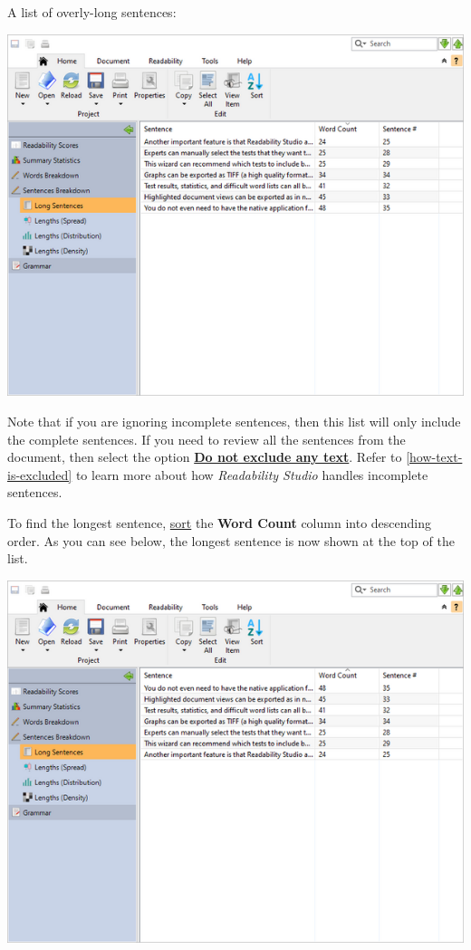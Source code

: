 \documentclass[
]{book}
\theoremstyle{definition}
\theoremstyle{definition}
\theoremstyle{definition}
\theoremstyle{definition}
\theoremstyle{remark}
\begin{document}
A list of overly-long sentences:

\includegraphics{Images/featuressentencelist.png}

Note that if you are ignoring incomplete sentences, then this list will only include the complete sentences. If you need to review all the sentences from the document, then select the option \protect\hyperlink{options-text-exclusion}{\textbf{Do not exclude any text}}. Refer to \ref{how-text-is-excluded} to learn more about how \emph{Readability Studio} handles incomplete sentences.

To find the longest sentence, \protect\hyperlink{column-sorting}{sort} the \textbf{Word Count} column into descending order. As you can see below, the longest sentence is now shown at the top of the list.

\includegraphics{Images/featuressentencelistsorted.png}
\end{document}
